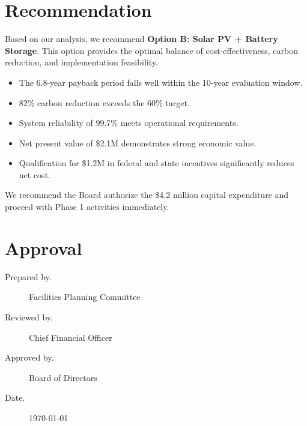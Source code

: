 \documentclass[
    language=english,
    doctype=feasibility-study,
    institution=none,
]{../../omnilatex}
\begin{document}
\section{Recommendation}

Based on our analysis, we recommend \textbf{Option B: Solar PV + Battery
Storage}. This option provides the optimal balance of cost-effectiveness,
carbon reduction, and implementation feasibility.

\begin{itemize}
    \item The 6.8-year payback period falls well within the 10-year
          evaluation window.
    \item 82\% carbon reduction exceeds the 60\% target.
    \item System reliability of 99.7\% meets operational requirements.
    \item Net present value of \$2.1M demonstrates strong economic value.
    \item Qualification for \$1.2M in federal and state incentives
          significantly reduces net cost.
\end{itemize}

We recommend the Board authorize the \$4.2 million capital expenditure and
proceed with Phase 1 activities immediately.

\section{Approval}

\begin{description}
    \item[Prepared by.] Facilities Planning Committee
    \item[Reviewed by.] Chief Financial Officer
    \item[Approved by.] Board of Directors
    \item[Date.] \today
\end{description}
\end{document}
